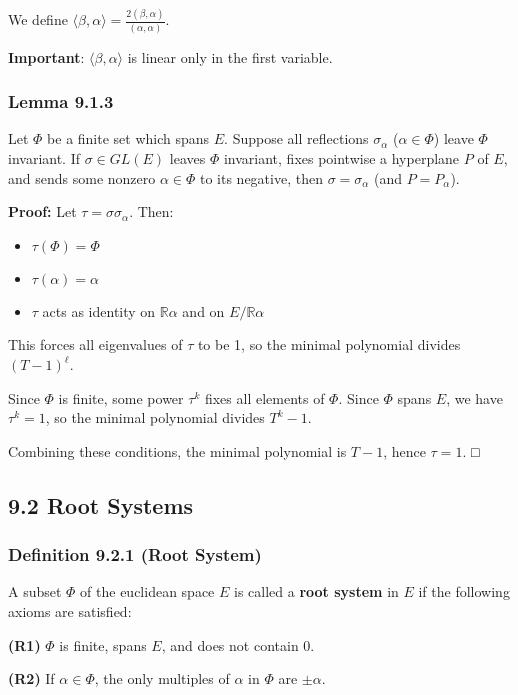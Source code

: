 We define $\langle\beta, \alpha\rangle = \frac{2(\beta, \alpha)}{(\alpha, \alpha)}$.

\textbf{Important}: $\langle\beta, \alpha\rangle$ is linear only in the first variable.

\subsubsection{Lemma 9.1.3}

Let $\Phi$ be a finite set which spans $E$. Suppose all reflections $\sigma_\alpha$ ($\alpha \in \Phi$) leave $\Phi$ invariant. If $\sigma \in GL(E)$ leaves $\Phi$ invariant, fixes pointwise a hyperplane $P$ of $E$, and sends some nonzero $\alpha \in \Phi$ to its negative, then $\sigma = \sigma_\alpha$ (and $P = P_\alpha$).

\textbf{Proof:}
Let $\tau = \sigma \sigma_\alpha$. Then:

\begin{itemize}
	\item $\tau(\Phi) = \Phi$
	\item $\tau(\alpha) = \alpha$
	\item $\tau$ acts as identity on $\mathbb{R}\alpha$ and on $E/\mathbb{R}\alpha$
\end{itemize}

This forces all eigenvalues of $\tau$ to be 1, so the minimal polynomial divides $(T-1)^\ell$.

Since $\Phi$ is finite, some power $\tau^k$ fixes all elements of $\Phi$. Since $\Phi$ spans $E$, we have $\tau^k = 1$, so the minimal polynomial divides $T^k - 1$.

Combining these conditions, the minimal polynomial is $T - 1$, hence $\tau = 1$. □

\subsection{9.2 Root Systems}

\subsubsection{Definition 9.2.1 (Root System)}

A subset $\Phi$ of the euclidean space $E$ is called a \textbf{root system} in $E$ if the following axioms are satisfied:

\textbf{(R1)} $\Phi$ is finite, spans $E$, and does not contain 0.

\textbf{(R2)} If $\alpha \in \Phi$, the only multiples of $\alpha$ in $\Phi$ are $\pm\alpha$.

